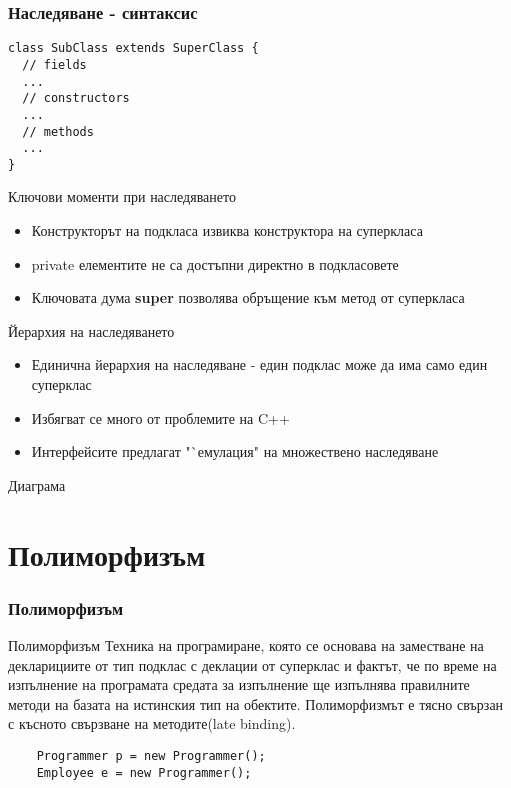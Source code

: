 \documentclass{beamer}
\begin{document}
\begin{frame}[fragile]
  \frametitle{Наследяване - синтаксис}
  \transdissolve
\begin{lstlisting}
class SubClass extends SuperClass {
  // fields
  ...
  // constructors
  ...
  // methods
  ...
}
\end{lstlisting}
\end{frame}

\begin{frame}{Ключови моменти при наследяването}
  \transdissolve
  \begin{itemize}
  \item Конструкторът на подкласа извиква конструктора на суперкласа
  \item private елементите не са достъпни директно в подкласовете
  \item Ключовата дума \textbf{super} позволява обръщение към метод от
    суперкласа
  \end{itemize}
\end{frame}

\begin{frame}{Йерархия на наследяването}
  \transdissolve
  \begin{itemize}
  \item Единична йерархия на наследяване - един подклас може да има
    само един суперклас
  \item Избягват се много от проблемите на C++
  \item Интерфейсите предлагат "`емулация" на множествено наследяване
  \end{itemize}
\end{frame}


\begin{frame}{Диаграма}
  \transdissolve
  
\end{frame}

\section{Полиморфизъм}

\begin{frame}[fragile]
  \frametitle{Полиморфизъм}
  \transdissolve
  \begin{block}{Полиморфизъм}
    Техника на програмиране, която се основава на заместване на
    декларициите от тип подклас с деклации от суперклас и фактът, че
    по време на изпълнение на програмата средата за изпълнение ще
    изпълнява правилните методи на базата на истинския тип на
    обектите. Полиморфизмът е тясно свързан с късното свързване на
    методите(late binding).
  \end{block}
  \begin{lstlisting}
    Programmer p = new Programmer();
    Employee e = new Programmer();
  \end{lstlisting}

\end{frame}
\end{document}
